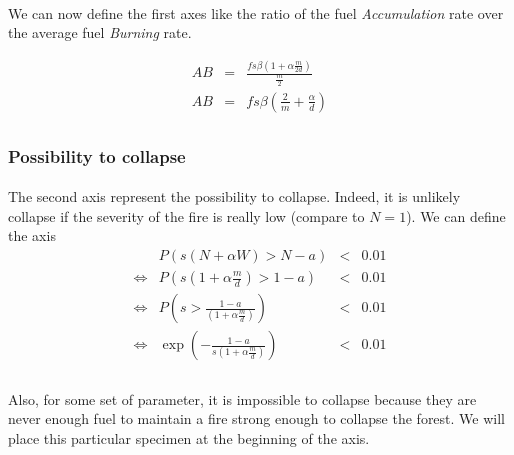 \documentclass{article}
\begin{document}
\paragraph{}
We can now define the first axes like the ratio of the fuel \textit{Accumulation} rate over the average fuel \textit{Burning} rate.

\[
\begin{array}{rcl}
AB & = & \frac{fs\beta(1+\alpha\frac{m}{2d})}{\frac{m}{2}} \\
AB & = & fs\beta(\frac{2}{m}+\frac{\alpha}{d}) \\
\end{array}
\]


\subsubsection{Possibility to collapse}


\paragraph{}
The second axis represent the possibility to collapse. Indeed, it is unlikely collapse if the severity of the fire is really low (compare to $N = 1$). We can define the axis 
\[
\begin{array}{rccl}
                &  P(s(N+\alpha W) > N-a ) & < & 0.01 \\
\Leftrightarrow &  P(s(1+\alpha \frac{m}{d}) > 1-a ) & < & 0.01 \\ 
\Leftrightarrow &  P(s > \frac{1-a}{(1+\alpha \frac{m}{d})} ) & < & 0.01 \\ 
\Leftrightarrow &  \exp(-\frac{1-a}{s(1+\alpha\frac{m}{d})}) & < & 0.01 \\ 
\end{array}
\]




\paragraph{}
Also, for some set of parameter, it is impossible to collapse because they are never enough fuel to maintain a fire strong enough to collapse the forest. We will place this particular specimen at the beginning of the axis.

\end{document}
